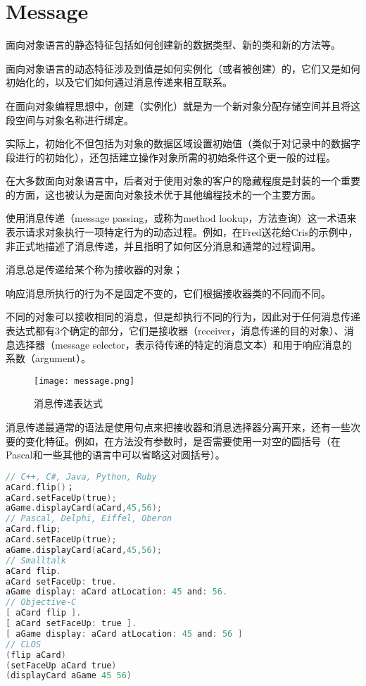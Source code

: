 \section{Message}


\begin{compactitem}
\item 面向对象语言的静态特征包括如何创建新的数据类型、新的类和新的方法等。
\item 面向对象语言的动态特征涉及到值是如何实例化（或者被创建）的，它们又是如何初始化的，以及它们如何通过消息传递来相互联系。
\end{compactitem}

在面向对象编程思想中，创建（实例化）就是为一个新对象分配存储空间并且将这段空间与对象名称进行绑定。

实际上，初始化不但包括为对象的数据区域设置初始值（类似于对记录中的数据字段进行的初始化），还包括建立操作对象所需的初始条件这个更一般的过程。

在大多数面向对象语言中，后者对于使用对象的客户的隐藏程度是封装的一个重要的方面，这也被认为是面向对象技术优于其他编程技术的一个主要方面。

使用消息传递（message passing，或称为method lookup，方法查询）这一术语来表示请求对象执行一项特定行为的动态过程。例如，在Fred送花给Cris的示例中，非正式地描述了消息传递，并且指明了如何区分消息和通常的过程调用。

\begin{compactitem}
\item 消息总是传递给某个称为接收器的对象；
\item 响应消息所执行的行为不是固定不变的，它们根据接收器类的不同而不同。
\end{compactitem}

不同的对象可以接收相同的消息，但是却执行不同的行为，因此对于任何消息传递表达式都有3个确定的部分，它们是接收器（receiver，消息传递的目的对象）、消息选择器（message selector，表示待传递的特定的消息文本）和用于响应消息的系数（argument）。

\begin{figure}[htbp]
\centering
\texttt{[image: message.png]}
\caption{消息传递表达式}
\label{fig:message}
\end{figure}

消息传递最通常的语法是使用句点来把接收器和消息选择器分离开来，还有一些次要的变化特征。例如，在方法没有参数时，是否需要使用一对空的圆括号（在Pascal和一些其他的语言中可以省略这对圆括号）。

\begin{lstlisting}[language=C]
// C++, C#, Java, Python, Ruby
aCard.flip()；
aCard.setFaceUp(true);
aGame.displayCard(aCard,45,56);
// Pascal, Delphi, Eiffel, Oberon
aCard.flip;
aCard.setFaceUp(true);
aGame.displayCard(aCard,45,56);
// Smalltalk
aCard flip.
aCard setFaceUp: true.
aGame display: aCard atLocation: 45 and: 56.
// Objective-C
[ aCard flip ].
[ aCard setFaceUp: true ].
[ aGame display: aCard atLocation: 45 and: 56 ]
// CLOS
(flip aCard)
(setFaceUp aCard true)
(displayCard aGame 45 56)
\end{lstlisting}

